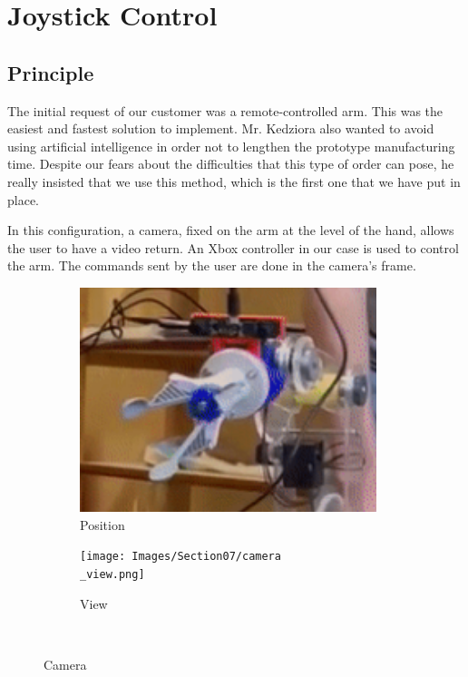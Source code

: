 \section{Joystick Control}\insertloftspace
\setcounter{figure}{0}\setcounter{table}{0}

\subsection{Principle}

The initial request of our customer was a remote-controlled arm. This was the easiest and fastest solution to implement. Mr. Kedziora also wanted to avoid using artificial intelligence in order not to lengthen the prototype manufacturing time. Despite our fears about the difficulties that this type of order can pose, he really insisted that we use this method, which is the first one that we have put in place.

\bigbreak
In this configuration, a camera, fixed on the arm at the level of the hand, allows the user to have a video return. An Xbox controller in our case is used to control the arm. The commands sent by the user are done in the camera's frame.
\begin{figure}[H]
    \begin{subfigure}{.5\linewidth}
        \centering
        \includegraphics[width=0.95\textwidth]{Images/Section07/camera.png}
        \caption{Position}
        \label{fig:CameraRobot}
    \end{subfigure}%
    \begin{subfigure}{.5\linewidth}
        \centering
        \texttt{[image: Images/Section07/camera\\\_view.png]}
        \caption{View}
        \label{fig:CameraView}
    \end{subfigure}\\[1ex]
    \caption{Camera}
    \label{fig:Camera}
\end{figure}
\FloatBarrier

